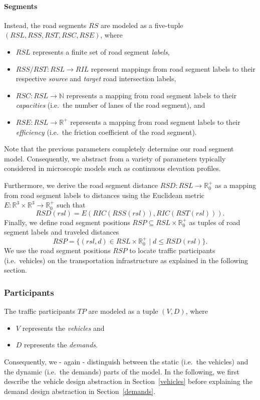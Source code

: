 \paragraph{Segments}
\label{segments}

Instead, the road segments $RS$ are modeled as a five-tuple $(RSL, RSS, RST, RSC, RSE)$, where
\begin{itemize}
	\item $RSL$ represents a finite set of road segment \textit{labels},
	\item $RSS/RST: RSL \rightarrow RIL$ represent mappings from road segment labels to their respective \textit{source} and \textit{target} road intersection labels,
	\item $RSC: RSL \rightarrow \mathbb{N}$ represents a mapping from road segment labels to their \textit{capacities} (i.e.\ the number of lanes of the road segment), and
	\item $RSE: RSL \rightarrow \mathbb{R}^+$ represents a mapping from road segment labels to their \textit{efficiency} (i.e.\ the friction coefficient of the road segment).
\end{itemize}
Note that the previous parameters completely determine our road segment model. Consequently, we abstract from a variety of parameters typically considered in microscopic models such as continuous elevation profiles.

Furthermore, we derive the road segment distance $RSD: RSL \rightarrow \mathbb{R}_0^+$ as a mapping from road segment labels to distances using the Euclidean metric $E: \mathbb{R}^3 \times \mathbb{R}^3 \rightarrow \mathbb{R}_0^+$ such that
\[
	RSD(rsl) = E(RIC(RSS(rsl)), RIC(RST(rsl))) \textrm{.}
\]
Finally, we define road segment positions $RSP \subseteq RSL \times \mathbb{R}_0^+$ as tuples of road segment labels and traveled distances
\[
	RSP = \{(rsl, d) \in RSL \times \mathbb{R}_0^+ \mid d \leq RSD(rsl)\} \textrm{.}
\]
We use the road segment positions $RSP$ to locate traffic participants (i.e.\ vehicles) on the transportation infrastructure as explained in the following section. 

\subsubsection{Participants}
\label{participants}

The traffic participants $TP$ are modeled as a tuple $(V, D)$, where
\begin{itemize}
	\item $V$ represents the \textit{vehicles} and
	\item $D$ represents the \textit{demands}.
\end{itemize}
Consequently, we - again - distinguish between the static (i.e.\ the vehicles) and the dynamic (i.e.\ the demands) parts of the model. In the following, we first describe the vehicle design abstraction in Section~\ref{vehicles} before explaining the demand design abstraction in Section~\ref{demands}.

